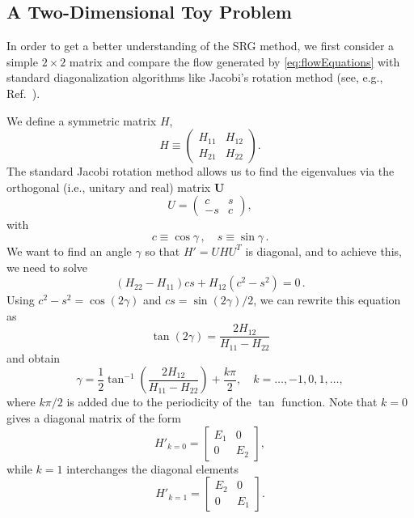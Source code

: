 \subsection{A Two-Dimensional Toy Problem}

In order to get a better understanding of the SRG method, we first consider  
a simple $2\times 2$ matrix and compare the flow generated by \eqref{eq:flowEquations} 
with standard diagonalization algorithms like Jacobi's rotation method (see,
e.g., Ref.~\cite{Golub:2013le}).

We define a symmetric matrix $H$, 
\begin{equation} 
  H \equiv \begin{pmatrix} H_{11} & H_{12} \\ H_{21} & H_{22}\end{pmatrix}. 
\end{equation}
The standard Jacobi rotation method allows us to find the eigenvalues via 
the orthogonal (i.e., unitary and real) matrix $\mathbf{U}$ 
\begin{equation}
  U = \begin{pmatrix} c & s \\ -s & c \end{pmatrix}, 
\end{equation}
with 
\begin{equation}
  c \equiv \cos \gamma\,,\quad s \equiv \sin \gamma\,.
\end{equation}
We want to find an angle $\gamma$ so that $H' = UHU^T$ is diagonal, and
to achieve this, we need to solve
\begin{equation}
(H_{22} - H_{11})cs + H_{12}(c^2 - s^2) = 0\,.
\end{equation}
Using $c^2-s^2 = \cos(2\gamma)$ and $cs = \sin(2\gamma)/2$, we can rewrite
this equation as
\begin{equation}
  \tan(2\gamma) = \frac{2 H_{12}}{H_{11}-H_{22}}
\end{equation}
and obtain
\begin{equation} 
\gamma = \frac{1}{2} \tan^{-1} \left( \frac{2H_{12}}{H_{11}-H_{22}}
\right) + \frac{k\pi}{2}, \quad k=\ldots,-1,0,1,\ldots, \label{eq:0} 
\end{equation}
where $k\pi/2$ is added due to the periodicity of the $\tan$ function.
Note that  $k=0$ gives a diagonal matrix of the form
\begin{equation} 
H'_{k=0} = \begin{bmatrix} E_1 & 0 \\ 0 & E_2 \end{bmatrix},
\label{eq:1} 
\end{equation}
while  $k=1$ interchanges the diagonal elements  
\begin{equation} 
H'_{k=1} = \begin{bmatrix} E_2 & 0 \\ 0 & E_1 \end{bmatrix}.
\label{eq:2}
\end{equation}

